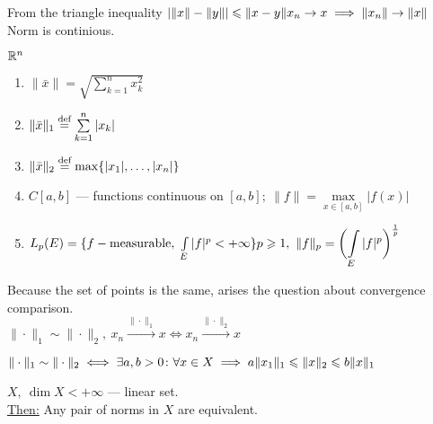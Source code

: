 \begin{stm}
  From the triangle inequality $|\|x\| - \|y\|| \leq \|x - y\| \\
  x_n \to x \implies \|x_n\| \to \|x\|$ \\
  Norm is continious.
\end{stm}
\begin{ex}
  $\R^n$ 
  \begin{enumerate}
  \item $\|\bar{x}\| = \sqrt{\sum\limits_{k = 1}^n x_k^2}$
  \item $\|\bar{x}\|_1 \defeq \sum\limits_{k = 1}^n|x_k|$
  \item $\|\bar{x}\|_2 \defeq \max \{|x_1|, \dotsc, |x_n|\}$
  \item $C[a, b]$ --- functions continuous on $[a, b];\ \|f\| = \max\limits_{x \in [a, b]}|f(x)|$ 
  \item $L_p (E) = \{f - \textnormal{measurable},\ \int\limits_E |f|^p < +
    \infty\}\\
    p \geq 1,\ \|f\|_p = \biggl(\displaystyle\int\limits_E |f|^p\biggr)^{\frac 1p}$
  \end{enumerate}
\end{ex}
Because the set of points is the same, arises the question about convergence
comparison. \\
$\|\cdot\|_1 \sim \|\cdot\|_2,\ x_n \overset{\|\cdot\|_1}{\to} x \iff x_n \overset{\|\cdot\|_2}{\to} x$
\begin{stm}
  $\\\|\cdot\|_1 \sim \|\cdot\|_2 \iff \exists a, b > 0\colon \forall x \in X
  \implies a\|x_1\|_1 \leq \|x\|_2 \leq b \|x\|_1$
\end{stm}
\begin{thm}[Riesz]
  $X,\ \dim{X} < +\infty$ --- linear set. \\
  \underline{Then:} Any pair of norms in $X$ are equivalent.
\end{thm}
